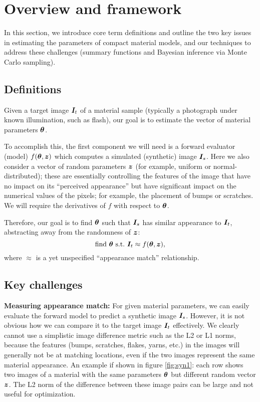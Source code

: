 \section{Overview and framework}

In this section, we introduce core term definitions and outline the two key issues in estimating the parameters of compact material models, and our techniques to address these challenges (summary functions and Bayesian inference via Monte Carlo sampling).

\subsection{Definitions}

Given a target image $\bm{I}_t$ of a material sample (typically a photograph under known illumination, such as flash), our goal is to estimate the vector of material parameters $\bm{\theta}$.

To accomplish this, the first component we will need is a forward evaluator (model) $f(\bm{\theta}, \bm{z})$ which computes a simulated (synthetic) image $\bm{I}_s$. Here we also consider a vector of random parameters $\bm{z}$ (for example, uniform or normal-distributed); these are essentially controlling the features of the image that have no impact on its ``perceived appearance'' but have significant impact on the numerical values of the pixels; for example, the placement of bumps or scratches. We will require the derivatives of $f$ with respect to $\bm{\theta}$.

Therefore, our goal is to find $\bm{\theta}$ such that $\bm{I}_s$ has similar appearance to $\bm{I}_t$, abstracting away from the randomness of $\bm{z}$:
\begin{equation}
	\mbox{find} \ \bm{\theta} \ \mbox{s.t.} \ \bm{I}_t \approx f(\bm{\theta}, \bm{z}),
\end{equation}
where $\approx$ is a yet unspecified ``appearance match'' relationship.


\subsection{Key challenges}

{\bf Measuring appearance match:} For given material parameters, we can easily evaluate the forward model to predict a synthetic image $\bm{I}_s$. However, it is not obvious how we can compare it to the target image $\bm{I}_t$ effectively. We clearly cannot use a simplistic image difference metric such as the L2 or L1 norms, because the features (bumps, scratches, flakes, yarns, etc.) in the images will generally not be at matching locations, even if the two images represent the same material appearance. An example if shown in figure \ref{fig:syn1}: each row shows two images of a material with the same parameters $\bm{\theta}$ but different random vector $\bm{z}$. The L2 norm of the difference between these image pairs can be large and not useful for optimization.

